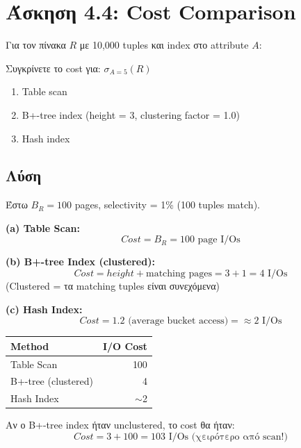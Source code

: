 \section{Άσκηση 4.4: Cost Comparison}

\begin{formulabox}[Εκφώνηση]
Για τον πίνακα $R$ με 10,000 tuples και index στο attribute $A$:

Συγκρίνετε το cost για: $\sigma_{A=5}(R)$

\begin{enumerate}
    \item Table scan
    \item B+-tree index (height = 3, clustering factor = 1.0)
    \item Hash index
\end{enumerate}
\end{formulabox}

\subsection*{Λύση}

Έστω $B_R = 100$ pages, selectivity = 1\% (100 tuples match).

\textbf{(a) Table Scan:}
$$Cost = B_R = 100 \text{ page I/Os}$$

\textbf{(b) B+-tree Index (clustered):}
$$Cost = height + \text{matching pages} = 3 + 1 = 4 \text{ I/Os}$$
(Clustered = τα matching tuples είναι συνεχόμενα)

\textbf{(c) Hash Index:}
$$Cost = 1.2 \text{ (average bucket access)} = \approx 2 \text{ I/Os}$$

\begin{center}
\begin{tabular}{lr}
\toprule
\textbf{Method} & \textbf{I/O Cost} \\
\midrule
Table Scan & 100 \\
B+-tree (clustered) & 4 \\
Hash Index & $\sim$2 \\
\bottomrule
\end{tabular}
\end{center}

\begin{warningbox}
Αν ο B+-tree index ήταν unclustered, το cost θα ήταν:
$$Cost = 3 + 100 = 103 \text{ I/Os (χειρότερο από scan!)}$$
\end{warningbox}
